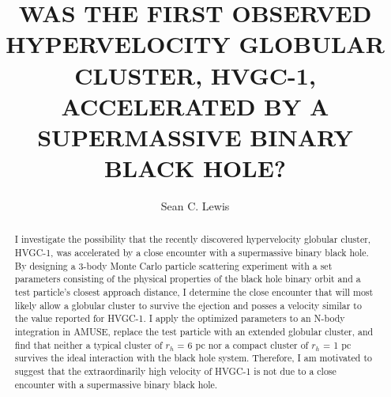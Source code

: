 \documentclass{aastex62}
\begin{document}
\title{WAS THE FIRST OBSERVED HYPERVELOCITY GLOBULAR CLUSTER, HVGC-1, ACCELERATED BY A SUPERMASSIVE BINARY BLACK HOLE?}

\author{Sean C. Lewis}



\begin{abstract}
I investigate the possibility that the recently discovered hypervelocity globular cluster, HVGC-1, was accelerated by a close encounter with a supermassive binary black hole. By designing a 3-body Monte Carlo particle scattering experiment with a set parameters consisting of the physical properties of the black hole binary orbit and a test particle's closest approach distance, I determine the close encounter that will most likely allow a globular cluster to survive the ejection and posses a velocity similar to the value reported for HVGC-1. I apply the optimized parameters to an N-body integration in AMUSE, replace the test particle with an extended globular cluster, and find that neither a typical cluster of \linebreak $r_{h}$ = 6 pc nor a compact cluster of $r_{h}$ = 1 pc survives the ideal interaction with the black hole system. Therefore, I am motivated to suggest that the extraordinarily high velocity of HVGC-1 is not due to a close encounter with a supermassive binary black hole.




\end{abstract}
\end{document}
